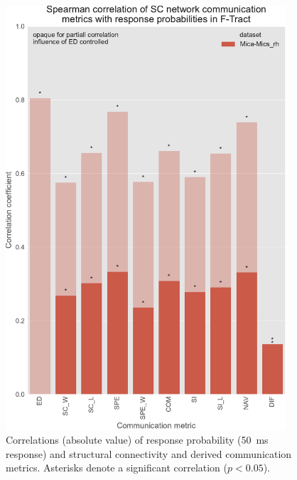 \begin{figure}
    \centering
    \includegraphics[width=0.93\textwidth]{images/nootebook_generated/ftract_results/MNI-HCP-MMP1/5/ED0/0.25/short/mica_rhSpearman_correlation_of_SC_network_communication_metrics_with_response_probabilities_in_F-Tract.pdf}
    \caption[F-Tract probability correlations - Mica-Mics\_rh 50 ms]{Correlations (absolute value) of response probability (50~ms response) and structural connectivity and derived communication metrics. Asterisks denote a significant correlation ($p<0.05$).}
    \label{fig:ftract_mica_short_probabilities}
\end{figure}

